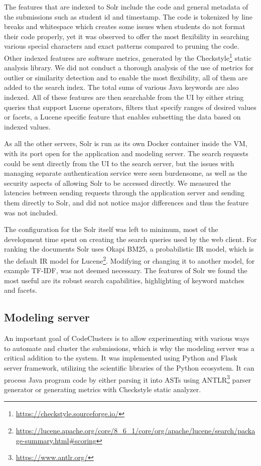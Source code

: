 The features that are indexed to Solr include the code and general metadata of the submissions such as student id and timestamp. The code is tokenized by line breaks and whitespace which creates some issues when students do not format their code properly, yet it was observed to offer the most flexibility in searching various special characters and exact patterns compared to pruning the code. Other indexed features are software metrics, generated by the Checkstyle\footnote{\url{https://checkstyle.sourceforge.io/}} static analysis library. We did not conduct a thorough analysis of the use of metrics for outlier or similarity detection and to enable the most flexibility, all of them are added to the search index. The total sums of various Java keywords are also indexed. All of these features are then searchable from the UI by either string queries that support Lucene operators, filters that specify ranges of desired values or facets, a Lucene specific feature that enables subsetting the data based on indexed values.

As all the other servers, Solr is run as its own Docker container inside the VM, with its port open for the application and modeling server. The search requests could be sent directly from the UI to the search server, but the issues with managing separate authentication service were seen burdensome, as well as the security aspects of allowing Solr to be accessed directly. We measured the latencies between sending requests through the application server and sending them directly to Solr, and did not notice major differences and thus the feature was not included.

The configuration for the Solr itself was left to minimum, most of the development time spent on creating the search queries used by the web client. For ranking the documents Solr uses Okapi BM25, a probabilistic IR model, which is the default IR model for Lucene\footnote{\url{https://lucene.apache.org/core/8\_6\_1/core/org/apache/lucene/search/package-summary.html\#scoring}}. Modifying or changing it to another model, for example TF-IDF, was not deemed necessary. The features of Solr we found the most useful are its robust search capabilities, highlighting of keyword matches and facets. 

\subsection{Modeling server}

An important goal of CodeClusters is to allow experimenting with various ways to automate and cluster the submissions, which is why the modeling server was a critical addition to the system. It was implemented using Python and Flask server framework, utilizing the scientific libraries of the Python ecosystem. It can process Java program code by either parsing it into ASTs using ANTLR\footnote{\url{https://www.antlr.org/}} parser generator or generating metrics with Checkstyle static analyzer.

